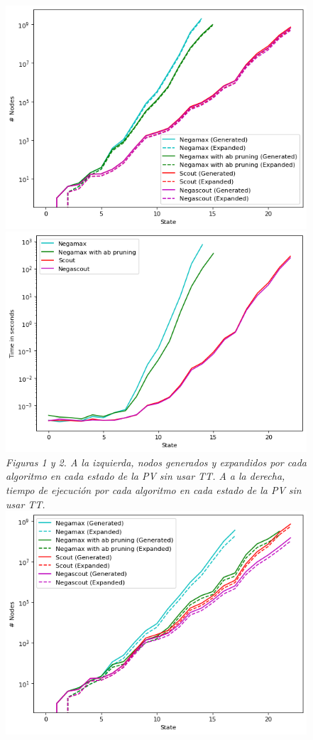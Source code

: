 \documentclass[a4paper,10pt]{article}
\begin{document}
\begin{figure}[t!]
  \centering
  \includegraphics[scale=0.5]{figura1.png}
  \includegraphics[scale=0.5]{figura2.png} \\ 
  \small{\textit{Figuras 1 y 2. A la izquierda, nodos generados y expandidos 
  por cada algoritmo en cada estado de la PV sin usar TT. A a la derecha, tiempo de 
  ejecuci\'on por cada algoritmo en cada estado de la PV sin usar TT.}}\\
  \includegraphics[scale=0.5]{figura5.png}

\end{figure}
\end{document}
